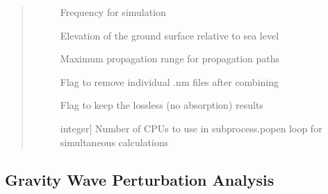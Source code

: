 \documentclass[letterpaper,10pt,english]{sphinxmanual}
\begin{document}
\begin{fulllineitems}
\begin{quote}
\begin{description}
\begin{description}
\item[{}] \leavevmode
\sphinxAtStartPar
Frequency for simulation

\item[{}] \leavevmode
\sphinxAtStartPar
Elevation of the ground surface relative to sea level

\item[{}] \leavevmode
\sphinxAtStartPar
Maximum propagation range for propagation paths

\item[{}] \leavevmode
\sphinxAtStartPar
Flag to remove individual .nm files after combining

\item[{}] \leavevmode
\sphinxAtStartPar
Flag to keep the lossless (no absorption) results

\item[{}] \leavevmode{[}integer{]}
\sphinxAtStartPar
Number of CPUs to use in subprocess.popen loop for simultaneous calculations

\end{description}

\end{description}\end{quote}

\end{fulllineitems}



\subsection{Gravity Wave Perturbation Analysis}
\label{\detokenize{stochprop.gravity:module-stochprop.gravity_waves}}\label{\detokenize{stochprop.gravity:gravity-wave-perturbation-analysis}}\label{\detokenize{stochprop.gravity::doc}}
\end{document}
